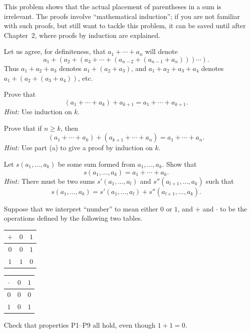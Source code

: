  This problem shows that the actual placement of parentheses in a
sum is irrelevant. The proofs involve ``mathematical induction''; if you are
not familiar with such proofs, but still want to tackle this problem, it can
be saved until after Chapter~2, where proofs by induction are explained.

Let us agree, for definiteness, that $a_1 + \cdots + a_n$ will denote
\[
a_1 + (a_2 + (a_3 + \cdots + (a_{n-2} + (a_{n-1} + a_n))) \cdots).
\]
Thus $a_1 + a_2 + a_3$ denotes $a_1 + (a_2 + a_3)$, and $a_1 + a_2 + a_3 + a_4$
denotes $a_1 + (a_2 + (a_3 + a_4))$, etc.

\begin{letters}
\item Prove that
\[
(a_1 + \cdots + a_k) + a_{k+1} = a_1 + \cdots + a_{k+1}.
\]
\textit{Hint:} Use induction on $k$.
\item Prove that if $n \geq k$, then
\[
(a_1 + \cdots + a_k) + (a_{k+1} + \cdots + a_n) = a_1 + \cdots + a_n.
\]
\textit{Hint:} Use part (a) to give a proof by induction on $k$.
\item Let $s(a_1, \dots, a_k)$ be some sum formed from $a_1, \dots, a_k$.
  Show that
\[ s(a_1, \dots, a_k) = a_1 + \cdots + a_k. \]
\textit{Hint:} There must be two sums $s'(a_1, \dots, a_l)$ and
$s''(a_{l+1}, \dots, a_k)$ such that
\[ s(a_1, \dots, a_k) = s'(a_1, \dots, a_l) + s''(a_{l+1}, \dots, a_k). \]
\end{letters}

 Suppose that we interpret ``number'' to mean either $0$ or $1$, and
$+$ and $\cdot$ to be the operations defined by the following two tables.
\begin{center}
\begin{tabular}{c|cc}
$+$ & $0$ & $1$ \\
\hline
$0$ & $0$ & $1$ \\
$1$ & $1$ & $0$
\end{tabular}
\qquad\qquad
\begin{tabular}{c|cc}
$\cdot$ & $0$ & $1$ \\
\hline
$0$ & $0$ & $0$ \\
$1$ & $0$ & $1$
\end{tabular}
\end{center}
Check that properties P1--P9 all hold, even though $1 + 1 = 0$.

